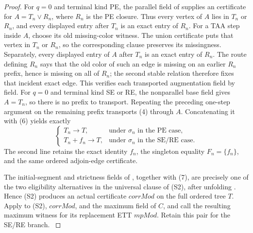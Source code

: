 \begin{proof}
For \(q=0\) and terminal kind PE, the parallel field of
 supplies an
 certificate for \(A=T_n\vee R_n\), where \(R_n\)
is the PE closure.  Thus every vertex of \(A\) lies in \(T_n\) or \(R_n\),
and every displayed entry after \(T_n\) is an exact entry of \(R_n\).
For a TAA step inside \(A\), choose its old missing-color witness.  The
union certificate puts that vertex in \(T_n\) or \(R_n\), so the
corresponding  clause preserves its missingness.
Separately, every displayed entry of \(A\) after \(T_n\) is an exact entry
of \(R_n\).  The  route defining \(R_n\) says
that the old color of such an edge is missing on an earlier \(R_n\)
prefix, hence is missing on all of \(R_n\); the second stable relation
therefore fixes that incident exact edge.  This verifies each transported
augmentation field by field.  For \(q=0\) and terminal kind SE or RE, the
nonparallel base field gives \(A=T_n\), so there is no prefix to transport.
Repeating the preceding one-step argument on the remaining prefix
transports (4) through \(A\).  Concatenating it with (6) yields exactly
\[
\begin{cases}
T_n\longrightarrow T,&\text{under }\sigma_n\text{ in the PE case},\\
T_n+f_n\longrightarrow T,&\text{under }\sigma_n\text{ in the SE/RE case}.
\end{cases}                                                     \tag{7}
\]
The second line retains the exact identity \(f_n\), the singleton equality
\(F_n=\{f_n\}\), and the same ordered adjoin-edge certificate.

The initial-segment and strictness fields of
, together with (7), are precisely one of
the two eligibility alternatives in the universal clause of (S2), after
unfolding .  Hence (S2) produces an actual
 certificate
\(\mathit{corrMod}\) on the full ordered tree \(T\).  Apply
 to (S2), \(\mathit{corrMod}\), and the
maximum field of \(C\), and call the resulting maximum witness for its
replacement ETT \(\mathit{mpMod}\).  Retain this pair for the SE/RE
branch.                                                               \(\tag{8}\)


\end{proof}
